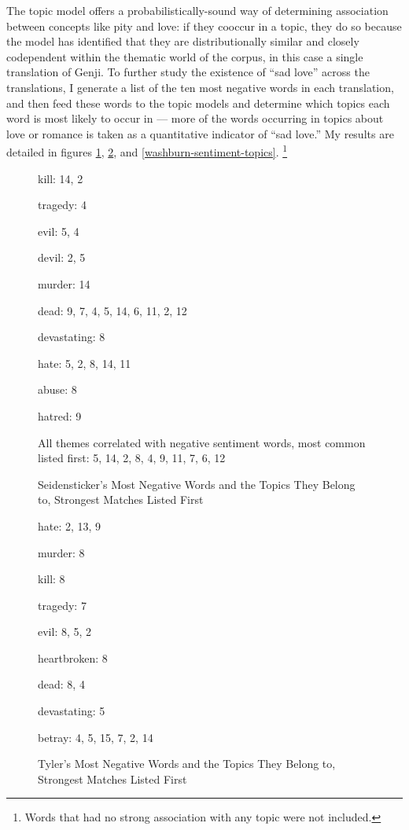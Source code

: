 \documentclass[12pt]{article}
\begin{document}
\begin{flushleft}
\begin{spacing}{2.0}
The topic model offers a probabilistically-sound way of determining association between concepts like pity and love: if they cooccur in a topic, they do so because the model has identified that they are distributionally similar and closely codependent within the thematic world of the corpus, in this case a single translation of Genji. To further study the existence of ``sad love'' across the translations, I generate a list of the ten most negative words in each translation, and then feed these words to the topic models and determine which topics each word is most likely to occur in --- more of the words occurring in topics about love or romance is taken as a quantitative indicator of ``sad love.'' My results are detailed in figures \ref{seidensticker-sentiment-topics}, \ref{tyler-sentiment-topics}, and \ref{washburn-sentiment-topics}. \footnote{Words that had no strong association with any topic were not included.} 

\begin{figure}
	\caption{Seidensticker's Most Negative Words and the Topics They Belong to, Strongest Matches Listed First}
	\label{seidensticker-sentiment-topics}
	kill: 14, 2
	
	tragedy: 4
	
	evil: 5, 4
	
	devil: 2, 5
	
	murder: 14
	
	dead: 9, 7, 4, 5, 14, 6, 11, 2, 12
	
	devastating: 8
	
	hate: 5, 2, 8, 14, 11
	
	abuse: 8
	
	hatred: 9
	
	All themes correlated with negative sentiment words, most common listed first: 5, 14, 2, 8, 4, 9, 11, 7, 6, 12
\end{figure}
\begin{figure}
	\caption{Tyler's Most Negative Words and the Topics They Belong to, Strongest Matches Listed First}
	\label{tyler-sentiment-topics}
	hate: 2, 13, 9
	
	murder: 8
	
	kill: 8
	
	tragedy: 7
	
	evil: 8, 5, 2
	
	heartbroken: 8
	
	dead: 8, 4
	
	devastating: 5
	
	betray: 4, 5, 15, 7, 2, 14
	

\end{figure}
\end{spacing}
\end{flushleft}
\end{document}
